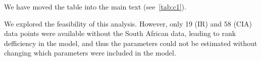 \begin{response}
We have moved the table into the main text (see~\ref{tab:c1}).
\end{response}
\begin{comment}
Consider a sensitivity analysis of the main findings without South African data
\end{comment}
\begin{response}
We explored the feasibility of this analysis.
However, only 19 (IR) and 58 (CIA) data points were available without the South African data,
leading to rank defficiency in the model,
and thus the parameters could not be estimated
without changing which parameters were included in the model.
\end{response}